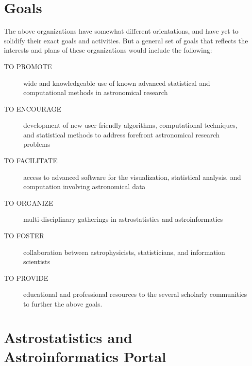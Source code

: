 \section{Goals}

The above organizations have somewhat different orientations, and have yet to solidify their exact goals and activities.  But a general set of goals that reflects the interests and plans of these organizations would include the following:

\begin{description}
\item[TO PROMOTE] wide and knowledgeable use of known advanced statistical and  computational methods in astronomical research
\item[TO ENCOURAGE] development of new user-friendly algorithms, computational techniques, and statistical methods to address forefront astronomical research  problems
\item[TO FACILITATE] access to advanced software for the visualization, statistical  analysis, and computation involving astronomical data
\item[TO ORGANIZE] multi-disciplinary gatherings in astrostatistics and  astroinformatics
\item[TO FOSTER] collaboration between astrophysicists, statisticians, and information scientists
\item[TO PROVIDE] educational and professional resources to the several scholarly  communities to further the above goals.
\end{description}

\section{Astrostatistics and Astroinformatics Portal}

